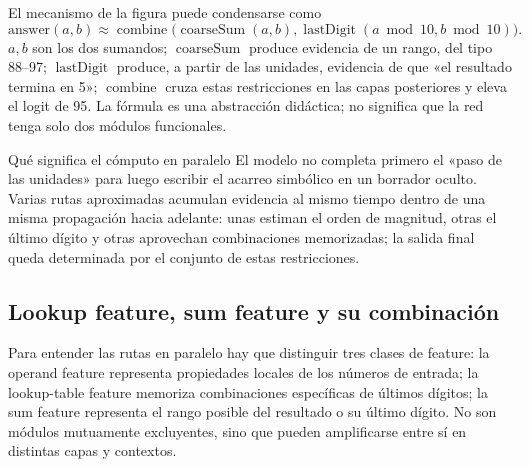 

El mecanismo de la figura puede condensarse como
\[
\text{answer}(a,b)\approx
\operatorname{combine}\bigl(
\operatorname{coarseSum}(a,b),
\operatorname{lastDigit}(a\bmod 10,b\bmod 10)
\bigr).
\]
$a,b$ son los dos sumandos; $\operatorname{coarseSum}$ produce evidencia de un rango, del tipo 88--97; $\operatorname{lastDigit}$ produce, a partir de las unidades, evidencia de que «el resultado termina en 5»; $\operatorname{combine}$ cruza estas restricciones en las capas posteriores y eleva el logit de 95. La fórmula es una abstracción didáctica; no significa que la red tenga solo dos módulos funcionales.

\begin{importantbox}{Qué significa el cómputo en paralelo}
El modelo no completa primero el «paso de las unidades» para luego escribir el acarreo simbólico en un borrador oculto. Varias rutas aproximadas acumulan evidencia al mismo tiempo dentro de una misma propagación hacia adelante: unas estiman el orden de magnitud, otras el último dígito y otras aprovechan combinaciones memorizadas; la salida final queda determinada por el conjunto de estas restricciones.
\end{importantbox}

\subsection{Lookup feature, sum feature y su combinación}

Para entender las rutas en paralelo hay que distinguir tres clases de feature: la operand feature representa propiedades locales de los números de entrada; la lookup-table feature memoriza combinaciones específicas de últimos dígitos; la sum feature representa el rango posible del resultado o su último dígito. No son módulos mutuamente excluyentes, sino que pueden amplificarse entre sí en distintas capas y contextos.



